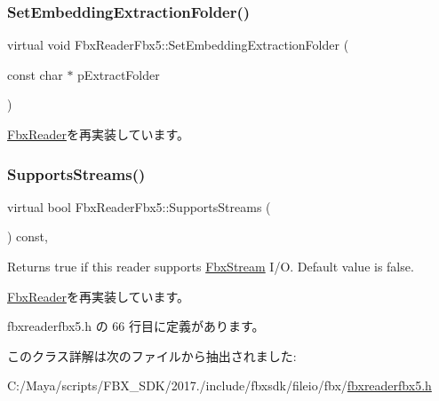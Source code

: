 \mbox{\label{class_fbx_reader_fbx5_ab910914828f297f51c28d88f466d6928}} 
\subsubsection{\texorpdfstring{Set\+Embedding\+Extraction\+Folder()}{SetEmbeddingExtractionFolder()}}
{\footnotesize\ttfamily virtual void Fbx\+Reader\+Fbx5\+::\+Set\+Embedding\+Extraction\+Folder (\begin{DoxyParamCaption}\item[{const char $\ast$}]{p\+Extract\+Folder }\end{DoxyParamCaption})\hspace{0.3cm}{\ttfamily [virtual]}}



\hyperlink{class_fbx_reader_a640eef510ddb298b2eaad0545b79de66}{Fbx\+Reader}を再実装しています。

\mbox{\label{class_fbx_reader_fbx5_ae6f619a41303077d9d4ed2935f3d2108}} 
\subsubsection{\texorpdfstring{Supports\+Streams()}{SupportsStreams()}}
{\footnotesize\ttfamily virtual bool Fbx\+Reader\+Fbx5\+::\+Supports\+Streams (\begin{DoxyParamCaption}{ }\end{DoxyParamCaption}) const\hspace{0.3cm}{\ttfamily [inline]}, {\ttfamily [virtual]}}

Returns true if this reader supports \hyperlink{class_fbx_stream}{Fbx\+Stream} I/O. Default value is false. 

\hyperlink{class_fbx_reader_ab08a9e71a059ef6052e7fe2d8ba6c35d}{Fbx\+Reader}を再実装しています。



 fbxreaderfbx5.\+h の 66 行目に定義があります。



このクラス詳解は次のファイルから抽出されました\+:\begin{DoxyCompactItemize}
\item 
C\+:/\+Maya/scripts/\+F\+B\+X\+\_\+\+S\+D\+K/2017./include/fbxsdk/fileio/fbx/\hyperlink{fbxreaderfbx5_8h}{fbxreaderfbx5.\+h}\end{DoxyCompactItemize}
